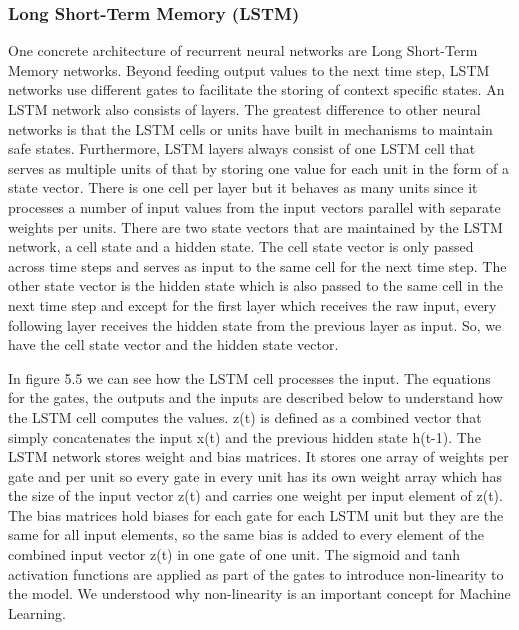 \documentclass[a4paper,12pt]{report}
\begin{document}
	\subsubsection{Long Short-Term Memory (LSTM)}
	One concrete architecture of recurrent neural networks are Long Short-Term Memory networks. Beyond feeding output values to the next time step, LSTM networks use different gates to facilitate the storing of context specific states. An LSTM network also consists of layers. The greatest difference to other neural networks is that the LSTM cells or units have built in mechanisms to maintain safe states. Furthermore, LSTM layers always consist of one LSTM cell that serves as multiple units of that by storing one value for each unit in the form of a state vector. There is one cell per layer but it behaves as many units since it processes a number of input values from the input vectors parallel with separate weights per units. There are two state vectors that are maintained by the LSTM network, a cell state and a hidden state. The cell state vector is only passed across time steps and serves as input to the same cell for the next time step. The other state vector is the hidden state which is also passed to the same cell in the next time step and except for the first layer which receives the raw input, every following layer receives the hidden state from the previous layer as input. So, we have the cell state vector and the hidden state vector.
	
	
In figure 5.5 we can see how the LSTM cell processes the input. The equations for the gates, the outputs and the inputs are described below to understand how the LSTM cell computes the values. z(t) is defined as a combined vector that simply concatenates the input x(t) and the previous hidden state h(t-1). The LSTM network stores weight and bias matrices. It stores one array of weights per gate and per unit so every gate in every unit has its own weight array which has the size of the input vector z(t) and carries one weight per input element of z(t). The bias matrices hold biases for each gate for each LSTM unit but they are the same for all input elements, so the same bias is added to every element of the combined input vector z(t) in one gate of one unit. The sigmoid and tanh activation functions are applied as part of the gates to introduce non-linearity to the model. We understood why non-linearity is an important concept for Machine Learning.	
	
	
	
\end{document}
